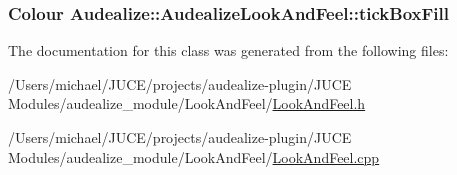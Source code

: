 \subsubsection[{\texorpdfstring{tick\+Box\+Fill}{tickBoxFill}}]{\setlength{\rightskip}{0pt plus 5cm}Colour Audealize\+::\+Audealize\+Look\+And\+Feel\+::tick\+Box\+Fill\hspace{0.3cm}{\ttfamily [protected]}}\hypertarget{class_audealize_1_1_audealize_look_and_feel_aaf004191d1a34a05f02bf31a24bc2865}{}\label{class_audealize_1_1_audealize_look_and_feel_aaf004191d1a34a05f02bf31a24bc2865}


The documentation for this class was generated from the following files\+:\begin{DoxyCompactItemize}
\item 
/\+Users/michael/\+J\+U\+C\+E/projects/audealize-\/plugin/\+J\+U\+C\+E Modules/audealize\+\_\+module/\+Look\+And\+Feel/\hyperlink{_look_and_feel_8h}{Look\+And\+Feel.\+h}\item 
/\+Users/michael/\+J\+U\+C\+E/projects/audealize-\/plugin/\+J\+U\+C\+E Modules/audealize\+\_\+module/\+Look\+And\+Feel/\hyperlink{_look_and_feel_8cpp}{Look\+And\+Feel.\+cpp}\end{DoxyCompactItemize}
